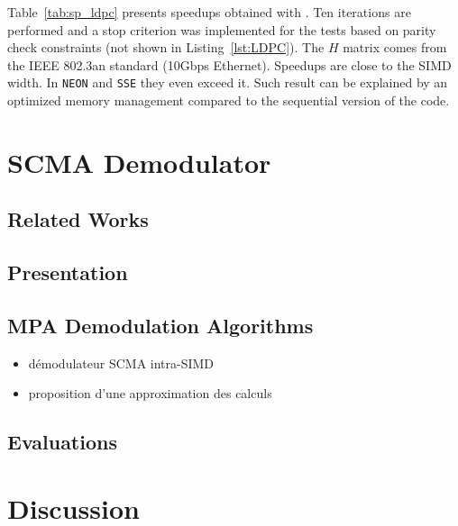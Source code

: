 Table~\ref{tab:sp_ldpc} presents speedups obtained with \MIPP. Ten iterations
are performed and a stop criterion was implemented for the tests based on parity
check constraints (not shown in Listing~\ref{lst:LDPC}). The $H$ matrix comes
from the IEEE 802.3an standard (10Gbps Ethernet). Speedups are close to the SIMD
width. In \verb|NEON| and \verb|SSE| they even exceed it. Such result can be
explained by an optimized memory management compared to the sequential version
of the code.

\section{SCMA Demodulator~\cite{Ghaffari2019}}

\subsection{Related Works}

\subsection{Presentation}

\subsection{MPA Demodulation Algorithms}

\begin{itemize}
  \item démodulateur SCMA intra-SIMD
  \item proposition d'une approximation des calculs
\end{itemize}

\subsection{Evaluations}

\section{Discussion}
